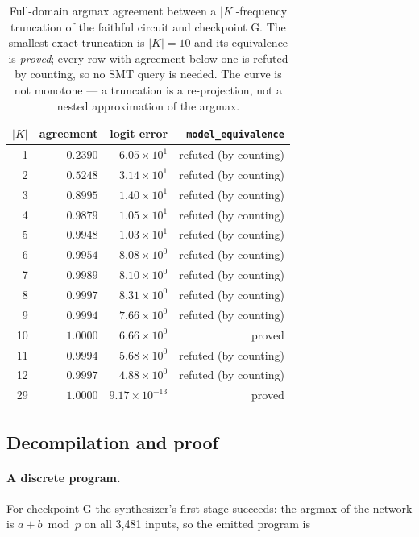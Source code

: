 \documentclass[11pt]{article}
\newcommand{\code}[1]{\texttt{#1}}
\begin{document}
\begin{table}[t]
\centering
\small
\begin{tabular}{@{}rrrr@{}}
\toprule
$|K|$ & agreement & logit error & \code{model\_equivalence} \\
\midrule
1 & $0.2390$ & $6.05\times10^{1}$ & refuted (by counting) \\
2 & $0.5248$ & $3.14\times10^{1}$ & refuted (by counting) \\
3 & $0.8995$ & $1.40\times10^{1}$ & refuted (by counting) \\
4 & $0.9879$ & $1.05\times10^{1}$ & refuted (by counting) \\
5 & $0.9948$ & $1.03\times10^{1}$ & refuted (by counting) \\
6 & $0.9954$ & $8.08\times10^{0}$ & refuted (by counting) \\
7 & $0.9989$ & $8.10\times10^{0}$ & refuted (by counting) \\
8 & $0.9997$ & $8.31\times10^{0}$ & refuted (by counting) \\
9 & $0.9994$ & $7.66\times10^{0}$ & refuted (by counting) \\
10 & $\mathbf{1.0000}$ & $6.66\times10^{0}$ & proved \\
11 & $0.9994$ & $5.68\times10^{0}$ & refuted (by counting) \\
12 & $0.9997$ & $4.88\times10^{0}$ & refuted (by counting) \\
29 & $\mathbf{1.0000}$ & $9.17\times10^{-13}$ & proved \\
\bottomrule
\end{tabular}
\caption{Full-domain argmax agreement between a $|K|$-frequency truncation of the faithful circuit and checkpoint G. The smallest exact truncation is $|K|=10$ and its equivalence is \emph{proved}; every row with agreement below one is refuted by counting, so no SMT query is needed. The curve is not monotone --- a truncation is a re-projection, not a nested approximation of the argmax.}\label{tab:size}
\end{table}

\subsection{Decompilation and proof}

\paragraph{A discrete program.} For checkpoint G the synthesizer's first stage succeeds: the argmax of the network is $a+b \bmod p$ on all 3,481 inputs, so the emitted program is
\end{document}
